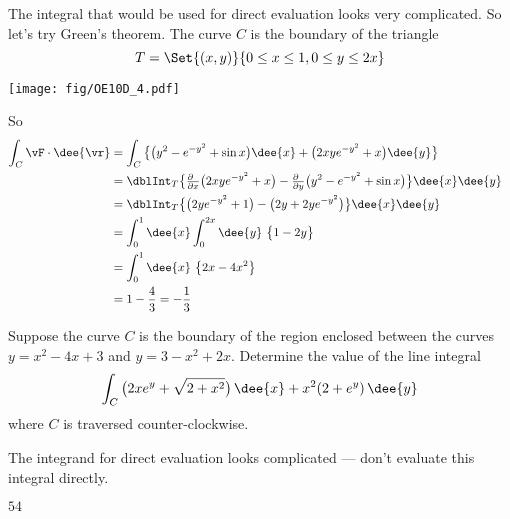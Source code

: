 \begin{solution}
The integral that would be used for direct evaluation looks very
complicated. So let's try Green's theorem. The curve $C$ is the
boundary of the triangle
\begin{equation*}
T = \Set{(x,y)}{0\le x\le 1, 0\le y\le 2x}
\end{equation*}
\begin{center}
\texttt{[image: fig/OE10D\_4.pdf]}
\end{center}
So
\begin{align*}
\int_C \vF\cdot\dee{\vr}
&= \int_C \big\{\big(y^2 - e^{-y^2} + \sin x\big)\dee{x}
               +\big(2xye^{-y^2} + x\big)\dee{y}\big\} \\
&= \dblInt_T \big\{
             \tfrac{\partial\hfill}{\partial x}\big(2xye^{-y^2} + x\big)
           -\tfrac{\partial\hfill}{\partial y}\big(y^2 - e^{-y^2} + \sin x\big)
               \big\}\dee{x}\dee{y} \hskip0.1in
\\
&= \dblInt_T \big\{
             \big(2ye^{-y^2} + 1\big)
           - \big(2y +2y e^{-y^2} \big)
               \big\}\dee{x}\dee{y} \\
&= \int_0^1\dee{x}\int_0^{2x}\dee{y}\  \big\{1-2y\big\} \\
&= \int_0^1\dee{x}\  \big\{2x-4x^2\big\} \\
&=1-\frac{4}{3} = -\frac{1}{3}
\end{align*}

\end{solution}

\begin{question}[M317 2009A] %
Suppose the curve $C$ is the boundary of the region enclosed between
the curves $y = x^2 - 4x+3$ and $y = 3 - x^2 + 2x$. Determine the value
of the line integral
\begin{equation*}
\int_C \big(2xe^y + \sqrt{2 + x^2}\big)\, \dee{x}
            + x^2 (2 + e^y)\, \dee{y}
\end{equation*}
where $C$ is traversed counter-clockwise.
\end{question}

\begin{hint}
The integrand for direct evaluation looks complicated ---
don't evaluate this integral directly.
\end{hint}

\begin{answer}
$54$
\end{answer}

